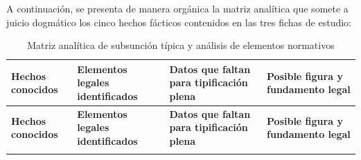 \documentclass[spanish,letterpaper,oneside]{article}
\begin{document}
A continuaci\'on, se presenta de manera org\'anica la matriz anal\'itica que somete a juicio dogm\'atico los cinco hechos f\'acticos contenidos en las tres fichas de estudio:

\clearpage
\pagestyle{empty}
\begin{landscape}
\begingroup
\scriptsize
\setlength{\tabcolsep}{4pt}
\renewcommand{\arraystretch}{1.08}
\setlength{\LTpre}{0pt}
\setlength{\LTpost}{0pt}
\begin{longtable}{@{}L{3.3cm} L{6.15cm} L{6.15cm} L{6.15cm}@{}}
\caption{Matriz anal\'itica de subsunci\'on t\'ipica y an\'alisis de elementos normativos}\label{tab:analisis_hechos}\\
\toprule
{}
\textbf{Hechos conocidos} & \textbf{Elementos legales identificados} & \textbf{Datos que faltan para tipificaci\'on plena} & \textbf{Posible figura y fundamento legal} \\
\midrule
\endfirsthead
\toprule
{}
\textbf{Hechos conocidos} & \textbf{Elementos legales identificados} & \textbf{Datos que faltan para tipificaci\'on plena} & \textbf{Posible figura y fundamento legal} \\
\midrule
\endhead
\bottomrule
\endfoot


\end{longtable}
\end{landscape}
\end{document}
